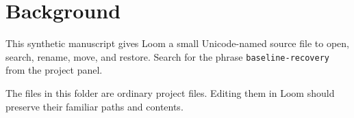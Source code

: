 \section{Background}

This synthetic manuscript gives Loom a small Unicode-named source file to open, search, rename, move, and restore. Search for the phrase \texttt{baseline-recovery} from the project panel.

The files in this folder are ordinary project files. Editing them in Loom should preserve their familiar paths and contents.
